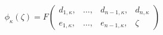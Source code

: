 \begin{equation}
\phi_{\kappa}(\zeta)=F\left(
\begin{array}{cccc}
d_{1,\kappa}, & \dots, & d_{n-1,\kappa}, & d_{n,\kappa}\\
e_{1,\kappa}, & \dots, & e_{n-1,\kappa}, & \zeta
\end{array}
\right)
\end{equation}


